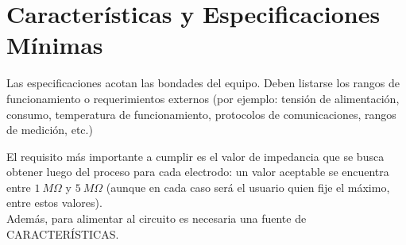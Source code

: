 \section{Características y Especificaciones Mínimas}
\color{blue}Las especificaciones acotan las bondades del equipo. Deben listarse los rangos de funcionamiento o requerimientos externos (por ejemplo: tensión de alimentación, consumo, temperatura de funcionamiento, protocolos de comunicaciones, rangos de medición, etc.)\\ \color{black}

El requisito más importante a cumplir es el valor de impedancia que se busca obtener luego del proceso para cada electrodo: un valor aceptable se encuentra entre $1\ M\Omega$ y $5\ M\Omega$ (aunque en cada caso será el usuario quien fije el máximo, entre estos valores).\\
Además, para alimentar al circuito es necesaria una fuente de \color{red}CARACTERÍSTICAS\color{black}.\\


